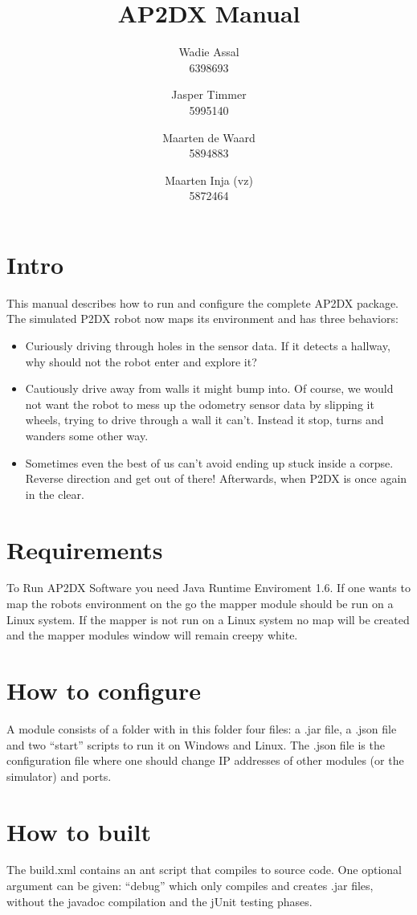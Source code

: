 \documentclass[a4paper, notitlepage]{article}
\title{AP2DX Manual}
\author{Wadie Assal \\ 6398693 \and Jasper Timmer \\ 5995140 \and Maarten de Waard \\ 5894883 \and Maarten Inja (vz) \\ 5872464}
\begin{document}
\maketitle

\section{Intro}
This manual describes how to run and configure the complete AP2DX package. The simulated P2DX robot now maps its environment and has three behaviors: 
\begin{itemize}
\item Curiously driving through holes in the sensor data. If it detects a hallway, why should not the robot enter and explore it? 
\item Cautiously drive away from walls it might bump into. Of course, we would not want the robot to mess up the odometry sensor data by slipping it wheels, 
trying to drive through a wall it can't. Instead it stop, turns and wanders some other way.
\item Sometimes even the best of us can't avoid ending up stuck inside a corpse. Reverse direction and get out of there! Afterwards, 
when P2DX is once again in the clear.
\end{itemize}

\section{Requirements}
To Run AP2DX Software you need Java Runtime Enviroment 1.6. If one wants to map the robots environment on the go 
the mapper module should be run on a Linux system. If the mapper is not run on a Linux system no map will be created
and the mapper modules window will remain creepy white. 

\section{How to configure}
A module consists of a folder with in this folder four files: 
a .jar file, a .json file and two ``start'' scripts to run it on Windows and Linux. The .json file is the configuration 
file where one should change IP addresses of other modules (or the simulator) and ports. 

\section{How to built}
The build.xml contains an ant script that compiles to source code. 
One optional argument can be given: ``debug'' which only compiles and 
creates .jar files, without the javadoc compilation and the jUnit testing phases.
\end{document}
